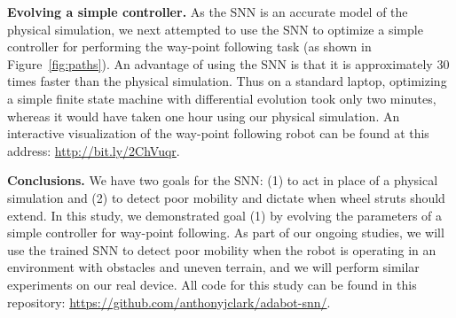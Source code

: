 \noindent
\textbf{Evolving a simple controller.}
%
As the SNN is an accurate model of the physical simulation, we next attempted to use the SNN to optimize a simple controller for performing the way-point following task (as shown in Figure~\ref{fig:paths}).
An advantage of using the SNN is that it is approximately 30 times faster than the physical simulation. Thus on a standard laptop, optimizing a simple finite state machine with differential evolution took only two minutes, whereas it would have taken one hour using our physical simulation.
%
An interactive visualization of the way-point following robot can be found at this address: \url{http://bit.ly/2ChVuqr}.


\noindent
\textbf{Conclusions.} We have two goals for the SNN: (1) to act in place of a physical simulation and (2) to detect poor mobility and dictate when wheel struts should extend.
%
In this study, we demonstrated goal (1) by evolving the parameters of a simple controller for way-point following.
%
As part of our ongoing studies, we will use the trained SNN to detect poor mobility when the robot is operating in an environment with obstacles and uneven terrain, and we will perform similar experiments on our real device. All code for this study can be found in this repository: \url{https://github.com/anthonyjclark/adabot-snn/}.
